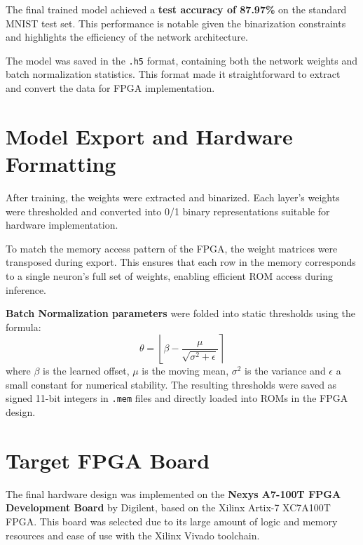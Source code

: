 \documentclass[a4paper,12pt]{report}
\begin{document}
The final trained model achieved a \textbf{test accuracy of 87.97\%} on the standard MNIST test set. This performance is notable given the binarization constraints and highlights the efficiency of the network architecture.

The model was saved in the \texttt{.h5} format, containing both the network weights and batch normalization statistics. This format made it straightforward to extract and convert the data for FPGA implementation.

\section{Model Export and Hardware Formatting}
After training, the weights were extracted and binarized. Each layer’s weights were thresholded and converted into 0/1 binary representations suitable for hardware implementation.

To match the memory access pattern of the FPGA, the weight matrices were transposed during export. This ensures that each row in the memory corresponds to a single neuron’s full set of weights, enabling efficient ROM access during inference.

\textbf{Batch Normalization parameters} were folded into static thresholds using the formula:
\[\theta = \left\lfloor \beta - \frac{\mu}{\sqrt{\sigma^2 + \epsilon}} \right\rceil\]
where $\beta$ is the learned offset, $\mu$ is the moving mean, $\sigma^2$ is the variance and $\epsilon$ a small constant for numerical stability. The resulting thresholds were saved as signed 11-bit integers in \texttt{.mem} files and directly loaded into ROMs in the FPGA design.


\section{Target FPGA Board}
The final hardware design was implemented on the \textbf{Nexys A7-100T FPGA Development Board} by Digilent, based on the Xilinx Artix-7 XC7A100T FPGA. This board was selected due to its large amount of logic and memory resources and ease of use with the Xilinx Vivado toolchain.
\end{document}

